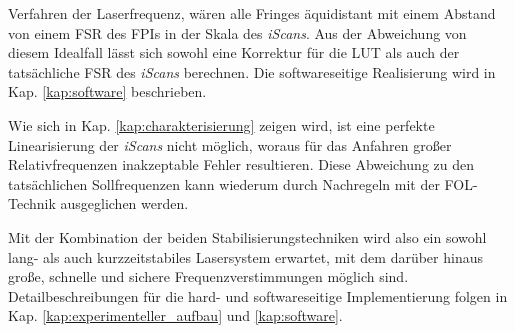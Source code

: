Verfahren der Laserfrequenz, wären alle Fringes äquidistant mit einem Abstand
von einem FSR des FPIs in der Skala des \textit{iScans}. Aus der Abweichung von
diesem Idealfall lässt sich sowohl eine Korrektur für die LUT als auch der tatsächliche
FSR des \textit{iScans} berechnen. Die softwareseitige Realisierung wird in Kap.
\ref{kap:software} beschrieben.\par
Wie sich in Kap. \ref{kap:charakterisierung} zeigen wird, ist eine perfekte
Linearisierung der \textit{iScans} nicht möglich, woraus für das Anfahren großer
Relativfrequenzen inakzeptable Fehler resultieren. Diese Abweichung zu den
tatsächlichen Sollfrequenzen kann wiederum durch Nachregeln mit der
FOL-Technik ausgeglichen werden.\par
Mit der Kombination der beiden Stabilisierungstechniken wird also ein sowohl
lang- als auch kurzzeitstabiles Lasersystem erwartet, mit dem darüber hinaus große, schnelle und sichere Frequenzverstimmungen möglich sind.
Detailbeschreibungen für die hard- und softwareseitige Implementierung folgen in
Kap. \ref{kap:experimenteller_aufbau} und \ref{kap:software}.